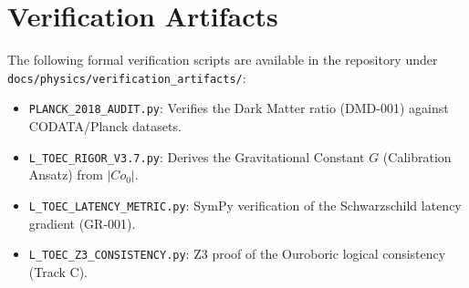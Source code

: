 \documentclass[11pt,titlepage]{article}
\begin{document}
\section{Verification Artifacts}
The following formal verification scripts are available in the repository under \texttt{docs/physics/verification\_artifacts/}:
\begin{itemize}
    
\item \texttt{PLANCK\_2018\_AUDIT.py}: Verifies the Dark Matter ratio (DMD-001) against CODATA/Planck datasets.
    
\item \texttt{L\_TOEC\_RIGOR\_V3.7.py}: Derives the Gravitational Constant $G$ (Calibration Ansatz) from $|Co_0|$.
    
\item \texttt{L\_TOEC\_LATENCY\_METRIC.py}: SymPy verification of the Schwarzschild latency gradient (GR-001).
    
\item \texttt{L\_TOEC\_Z3\_CONSISTENCY.py}: Z3 proof of the Ouroboric logical consistency (Track C).
\end{itemize}
\end{document}
